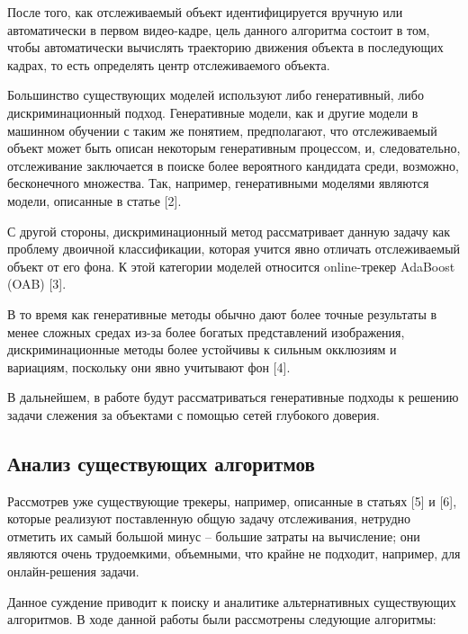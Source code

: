 После того, как отслеживаемый объект идентифицируется вручную или автоматически в первом видео-кадре, цель данного алгоритма состоит в том, чтобы автоматически вычислять траекторию движения объекта в последующих кадрах, то есть определять центр отслеживаемого объекта.

Большинство существующих моделей используют либо генеративный, либо дискриминационный подход. Генеративные модели, как и другие модели в машинном обучении с таким же понятием, предполагают, что отслеживаемый объект может быть описан некоторым генеративным процессом, и, следовательно, отслеживание заключается в поиске более вероятного кандидата среди, возможно, бесконечного множества. Так, например, генеративными моделями являются модели, описанные в статье [2].

С другой стороны, дискриминационный метод рассматривает данную задачу как проблему двоичной классификации, которая учится явно отличать отслеживаемый объект от его фона. К этой категории моделей относится online-трекер AdaBoost (OAB) [3].

В то время как генеративные методы обычно дают более точные результаты в менее сложных средах из-за более богатых представлений изображения, дискриминационные методы более устойчивы к сильным окклюзиям и вариациям, поскольку они явно учитывают фон [4].

В дальнейшем, в работе будут рассматриваться генеративные подходы к решению задачи слежения за объектами с помощью сетей глубокого доверия.

\subsection{Анализ существующих алгоритмов}

Рассмотрев уже существующие трекеры, например, описанные  в статьях [5] и [6], которые реализуют поставленную общую задачу отслеживания, нетрудно отметить их самый большой минус -- большие затраты на вычисление; они являются очень трудоемкими, объемными, что крайне не подходит, например, для онлайн-решения задачи.

Данное суждение приводит к поиску и аналитике альтернативных существующих алгоритмов. В ходе данной работы были рассмотрены следующие алгоритмы:


